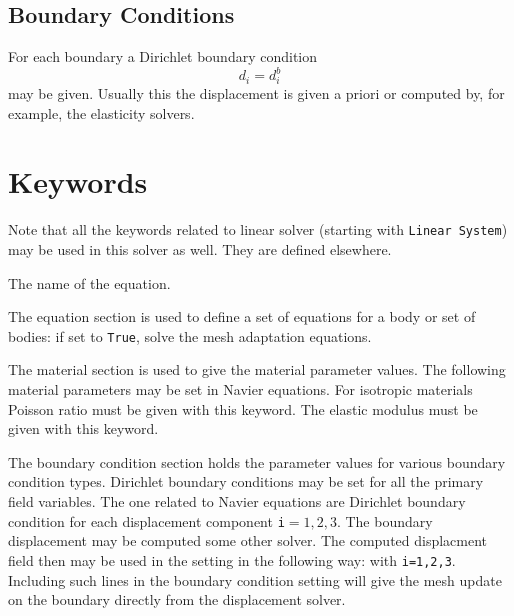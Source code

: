 \begin{versiona}
\subsection{Boundary Conditions}

For each boundary a Dirichlet boundary condition
\begin{equation}
d_i = d_i^b
\end{equation}
may be given. Usually this the displacement is given a priori or computed
by, for example, the elasticity solvers.

\section{Keywords} 
\end{versiona}

\sifbegin

Note that all the keywords related to linear solver (starting
with {\tt Linear System})
may be used in this solver as well.  They are defined elsewhere. 

\sifbegin
{} 
The name of the equation.
\sifend

The equation section is used to define a set of equations for a body or set of bodies:
\sifbegin
{} if set to {\tt True}, solve the mesh adaptation equations.
\sifend

The material section is used to give the material parameter values. The
following material parameters may be set in Navier equations.
\sifbegin
{} 
For isotropic materials Poisson ratio must be given with this keyword.
 The elastic modulus must be given with this
keyword.
\sifend


The boundary condition section holds the parameter values for various
boundary condition types. Dirichlet boundary conditions may be
set for all the primary field variables. The one related to Navier equations
are
\sifbegin
{} 
Dirichlet boundary condition
for each displacement component {\tt i}$=1,2,3$.
The boundary displacement may be computed some other solver. The computed
displacment field then may be used in the setting in the following way:
with \texttt{i=1,2,3}.
Including such lines in the boundary condition setting will give
the mesh update on the boundary directly from the displacement solver.
\sifend
\sifend


